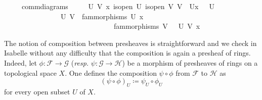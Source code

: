\documentclass[12pt]{scrartcl}
\begin{document}
\begin{isabelle}
\ \ \ \ \ comm{\isacharunderscore}{\kern0pt}diagrams{\isacharcolon}{\kern0pt}\ \isanewline
\ \ \ \ {\isachardoublequoteopen}{\isasymAnd}U\ V\ x{\isachardot}{\kern0pt}\ {\isasymlbrakk}is{\isacharunderscore}{\kern0pt}open\ U{\isacharsemicolon}{\kern0pt}\ is{\isacharunderscore}{\kern0pt}open\ V{\isacharsemicolon}{\kern0pt}\ V\ {\isasymsubseteq}\ U{\isacharsemicolon}{\kern0pt}x\ {\isasymin}\ {\isasymFF}\ U\ {\isasymrbrakk}\isanewline
\ \ \ \ \ \ \ \ \ \ \ \ \ \ {\isasymLongrightarrow}\ {\isacharparenleft}{\kern0pt}{\isasymrho}{\isacharprime}{\kern0pt}\ U\ V\ {\isasymcirc}\ fam{\isacharunderscore}{\kern0pt}morphisms\ U{\isacharparenright}{\kern0pt}\ x\ \isanewline
\ \ \ \ \ \ \ \ \ \ \ \ \ \ \ \ \ \ \ \ \ \ \ \ \ \ \ \ \ \ {\isacharequal}{\kern0pt}\ {\isacharparenleft}{\kern0pt}fam{\isacharunderscore}{\kern0pt}morphisms\ V\ {\isasymcirc}\ {\isasymrho}\ U\ V{\isacharparenright}{\kern0pt}\ x{\isachardoublequoteclose}
\end{isabelle}

The notion of composition between presheaves is straightforward and we check in Isabelle without any difficulty that the composition is again a presheaf of rings. \\
Indeed,	let $\phi: \mathscr{F} \rightarrow \mathscr{G}$ (\textit{resp.} $\psi: \mathscr{G} \rightarrow \mathscr{H}$) be a morphism of presheaves of rings on a topological space $X$. One defines the composition $\psi \circ \phi$ from $\mathscr{F}$ to $\mathscr{H}$ as 
	\[
	(\psi \circ \phi)_U \coloneqq \psi_U \circ \phi_U
	\]
	for every open subset $U$ of $X$.
\end{document}
